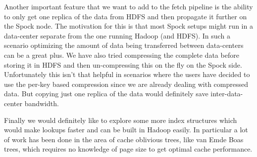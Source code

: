 \documentclass[twocolumn]{article}
\newcommand{\projectname}{Spock}
\begin{document}
Another important feature that we want to add to the fetch pipeline is the ability to only get one replica of the data from HDFS and then propagate it further on the \projectname{} node. The motivation for this is that most \projectname{} setups might run in a data-center separate from the one running Hadoop (and HDFS). In such a scenario optimizing the amount of data being transferred between data-centers can be a great plus. We have also tried compressing the complete data before storing it in HDFS and then un-compressing this on the fly on the \projectname{} side. Unfortunately this isn't that helpful in scenarios where the users have decided to use the per-key based compression since we are already dealing with compressed data. But copying just one replica of the data would definitely save inter-data-center bandwidth. 

Finally we would definitely like to explore some more index structures which would make lookups faster and can be built in Hadoop easily. In particular a lot of work has been done in the area of cache oblivious trees, like van Emde Boas trees, which requires no knowledge of page size to get optimal cache performance. 
\end{document}
